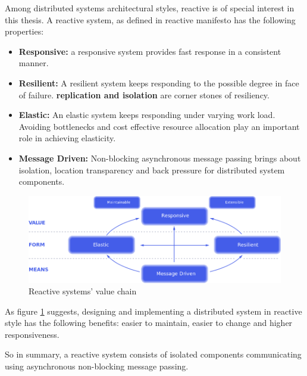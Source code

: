 \documentclass[a4]{report}
\begin{document}
    Among distributed systems architectural styles, reactive is of special interest in this thesis.
    A reactive system, as defined in reactive manifesto \cite{reactive-manifesto} has the following properties:
    \begin{itemize}
        \item \textbf{Responsive:} a responsive system provides fast response in a consistent manner.
        \item \textbf{Resilient:} A resilient system keeps responding to the possible degree in face of failure.
        \textbf{replication and isolation} are corner stones of resiliency.
        \item \textbf{Elastic:} An elastic system keeps responding under varying work load. Avoiding bottlenecks and cost
        effective resource allocation play an important role in achieving elasticity.
        \item \textbf{Message Driven:} Non-blocking asynchronous message passing brings about isolation, location
        transparency and back pressure for distributed system components.
    \end{itemize}

    \begin{figure}[ht]
        \caption{Reactive systems' value chain \cite{reactive-manifesto}}
        \label{fig:reactive-value}
        \includegraphics[width=\linewidth, scale=0.4]{images/reactive-traits.png}
    \end{figure}

    As figure \ref{fig:reactive-value} suggests, designing and implementing a distributed system in reactive style
    has the following benefits: easier to maintain, easier to change and higher responsiveness.

    So in summary, a reactive system consists of isolated components communicating using asynchronous non-blocking message passing.
\end{document}
